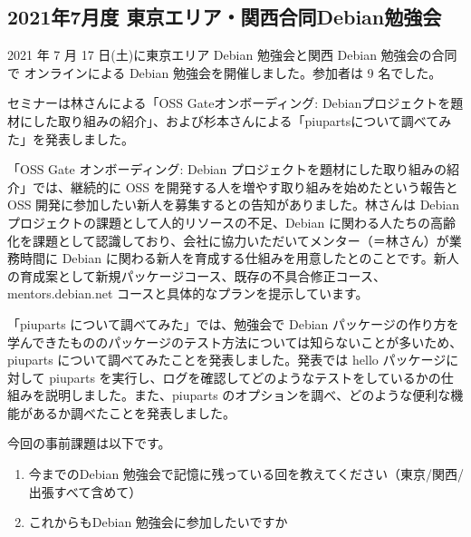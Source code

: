 \documentclass[mingoth,a4paper]{jsarticle}
\begin{document}

\subsection{2021年7月度 東京エリア・関西合同Debian勉強会}

2021 年 7 月 17 日(土)に東京エリア Debian 勉強会と関西 Debian 勉強会の合同で
オンラインによる Debian 勉強会を開催しました。参加者は 9 名でした。

セミナーは林さんによる「OSS Gateオンボーディング: Debianプロジェクトを題材にした取り組みの紹介」、および杉本さんによる「piupartsについて調べてみた」を発表しました。

「OSS Gate オンボーディング: Debian プロジェクトを題材にした取り組みの紹介」では、継続的に OSS を開発する人を増やす取り組みを始めたという報告と OSS 開発に参加したい新人を募集するとの告知がありました。林さんは Debian プロジェクトの課題として人的リソースの不足、Debian に関わる人たちの高齢化を課題として認識しており、会社に協力いただいてメンター（＝林さん）が業務時間に Debian に関わる新人を育成する仕組みを用意したとのことです。新人の育成案として新規パッケージコース、既存の不具合修正コース、mentors.debian.net コースと具体的なプランを提示しています。

「piuparts について調べてみた」では、勉強会で Debian パッケージの作り方を学んできたもののパッケージのテスト方法については知らないことが多いため、piuparts について調べてみたことを発表しました。発表では hello パッケージに対して piuparts を実行し、ログを確認してどのようなテストをしているかの仕組みを説明しました。また、piuparts のオプションを調べ、どのような便利な機能があるか調べたことを発表しました。



今回の事前課題は以下です。

\begin{enumerate}
  \item 今までのDebian 勉強会で記憶に残っている回を教えてください（東京/関西/出張すべて含めて）
  \item これからもDebian 勉強会に参加したいですか
\end{enumerate}


\begin{multicols}{2}
{\small
  
}
\end{multicols}
\end{document}
